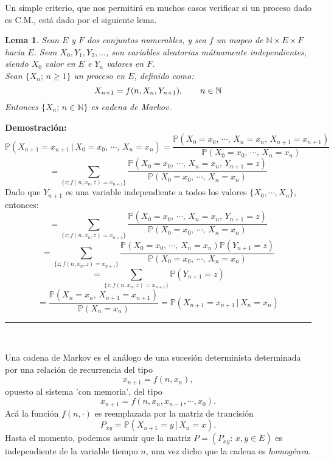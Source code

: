 \documentclass[a4paper]{article}
\newcommand{\prob}{\mathbb{P}}
\newtheorem{lem}{Lema}
\numberwithin{equation}{subsection}
\def\N{\mathbb N}
\begin{document}
Un simple criterio, que nos permitirá en muchos casos verificar si un proceso dado es C.M., está dado por el siguiente lema.

\begin{lem}
Sean $E$ y $F$ dos conjuntos numerables, y sea $f$ un mapeo de $\N\times E \times F$ hacia $E$. Sean $X_0,Y_1,Y_2,...$, son variables aleatorias mútuamente independientes, siendo $X_0$ valor en $E$ e $Y_n$ valores en $F$.\\ 
Sean $\{X_n;\,n\geq 1\}$ un proceso en $E$, definido como:
\[X_{n+1} = f(n,X_n,Y_{n+1}),\hspace{0.7cm}n\in\N\]
Entonces $\{X_n;\,n\in\N\}$ es cadena de Markov.
\end{lem}

\textbf{Demostración: }
\[\prob\left(X_{n+1} = x_{n+1}\,|\,X_0=x_0,\,\cdots,\,X_n=x_n\right) = \frac{\prob\left(X_0=x_0,\,\cdots,\,X_n=x_n,\,X_{n+1}=x_{n+1}\right)}{\prob\left(X_0=x_0,\,\cdots,\,X_n=x_n\right)}\]
\[ = \sum_{\{z;f(n,x_n,z)=x_{n+1}\}}\frac{\prob\left(X_0=x_0,\,\cdots,\,X_n=x_n,\,Y_{n+1}=z\right)}{\prob\left(X_0=x_0,\,\cdots,\,X_n=x_n\right)}\]
Dado que $Y_{n+1}$ es una variable independiente a todos los valores $\{X_0,\cdots,X_n\}$, entonces:
\[ = \sum_{\{z;f(n,x_n,z)=x_{n+1}\}}\frac{\prob\left(X_0=x_0,\,\cdots,\,X_n=x_n,\,Y_{n+1}=z\right)}{\prob\left(X_0=x_0,\,\cdots,\,X_n=x_n\right)}\]
\[ = \sum_{\{z;f(n,x_n,z)=x_{n+1}\}}\frac{\prob\left(X_0=x_0,\,\cdots,\,X_n=x_n\right)\prob\left(Y_{n+1}=z\right)}{\prob\left(X_0=x_0,\,\cdots,\,X_n=x_n\right)}\]
\[ = \sum_{\{z;f(n,x_n,z)=x_{n+1}\}}\prob\left(Y_{n+1}=z\right)\]
\[=\frac{\prob\left(X_n = x_n,\,X_{n+1}=x_{n+1}\right)}{\prob\left(X_n =x_n\right)} = \prob\left(X_{n+1}=x_{n+1}\,|\,X_n=x_n\right)\]
\rule{0.7em}{0.7em}\\ \newline

Una cadena de Markov es el análogo de una sucesión determinista determinada por una relación de recurrencia del tipo
\[x_{n+1} = f(n,x_n),\]
opuesto al sistema 'con memoria', del tipo
\[x_{n+1} = f(n,x_n,x_{n-1},\cdots,x_0).\]
Acá la función $f(n,\cdot)$ es reemplazada por la matriz de trancisión
\[P_{xy}= \prob\left(X_{n+1}=y\,|\,X_n =x\right).\]
Hasta el momento, podemos asumir que la matriz $P=\left(P_{xy}:\,x,y\in E\right)$ es independiente de la variable tiempo $n$, una vez dicho que la cadena es \textit{homogénea}.
\end{document}
